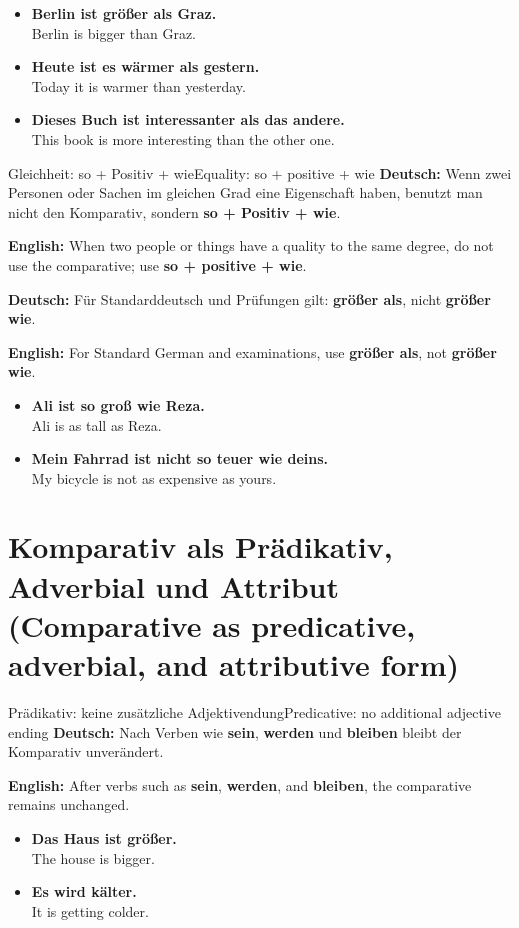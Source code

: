 \documentclass[a4paper,11pt]{article}
\newcommand{\GermanText}[1]{\textbf{Deutsch: }#1\par}
\newcommand{\EnglishText}[1]{{\small\color{SoftGray}\textbf{English: }#1\par}}
\newcommand{\ExampleItem}[2]{\item \textbf{#1}\\{\small\color{SoftGray}#2}}
\begin{document}
\begin{exbox}
\begin{itemize}
\ExampleItem{Berlin ist größer als Graz.}{Berlin is bigger than Graz.}
\ExampleItem{Heute ist es wärmer als gestern.}{Today it is warmer than yesterday.}
\ExampleItem{Dieses Buch ist interessanter als das andere.}{This book is more interesting than the other one.}
\end{itemize}
\end{exbox}

\begin{grammarentry}{Gleichheit: so + Positiv + wie}{Equality: so + positive + wie}
\GermanText{Wenn zwei Personen oder Sachen im gleichen Grad eine Eigenschaft haben, benutzt man nicht den Komparativ, sondern \textbf{so + Positiv + wie}.}
\EnglishText{When two people or things have a quality to the same degree, do not use the comparative; use \textbf{so + positive + wie}.}

\GermanText{Für Standarddeutsch und Prüfungen gilt: \textbf{größer als}, nicht \textbf{größer wie}.}
\EnglishText{For Standard German and examinations, use \textbf{größer als}, not \textbf{größer wie}.}
\end{grammarentry}

\begin{exbox}
\begin{itemize}
\ExampleItem{Ali ist so groß wie Reza.}{Ali is as tall as Reza.}
\ExampleItem{Mein Fahrrad ist nicht so teuer wie deins.}{My bicycle is not as expensive as yours.}
\end{itemize}
\end{exbox}

\section{Komparativ als Prädikativ, Adverbial und Attribut \textnormal{(Comparative as predicative, adverbial, and attributive form)}}

\begin{grammarentry}{Prädikativ: keine zusätzliche Adjektivendung}{Predicative: no additional adjective ending}
\GermanText{Nach Verben wie \textbf{sein}, \textbf{werden} und \textbf{bleiben} bleibt der Komparativ unverändert.}
\EnglishText{After verbs such as \textbf{sein}, \textbf{werden}, and \textbf{bleiben}, the comparative remains unchanged.}
\end{grammarentry}

\begin{exbox}
\begin{itemize}
\ExampleItem{Das Haus ist größer.}{The house is bigger.}
\ExampleItem{Es wird kälter.}{It is getting colder.}
\end{itemize}
\end{exbox}
\end{document}
